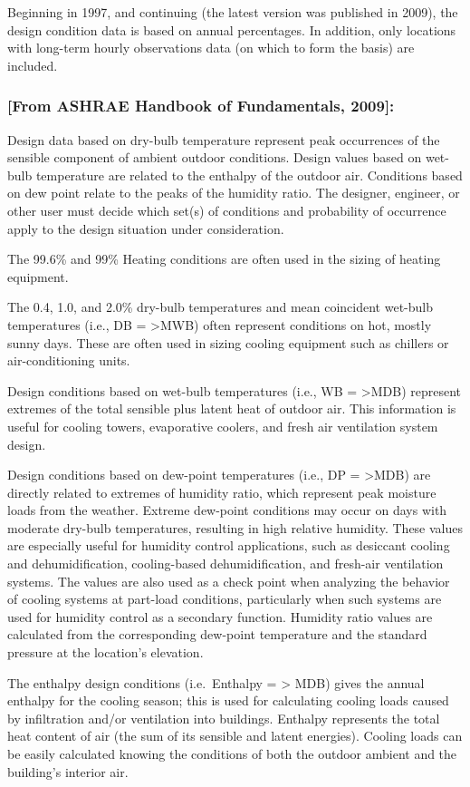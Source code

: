 Beginning in 1997, and continuing (the latest version was published in 2009), the design condition data is based on annual percentages. In addition, only locations with long-term hourly observations data (on which to form the basis) are included.

\subsubsection{{[}From ASHRAE Handbook of Fundamentals, 2009{]}:}\label{from-ashrae-handbook-of-fundamentals-2009}

Design data based on dry-bulb temperature represent peak occurrences of the sensible component of ambient outdoor conditions. Design values based on wet-bulb temperature are related to the enthalpy of the outdoor air. Conditions based on dew point relate to the peaks of the humidity ratio. The designer, engineer, or other user must decide which set(s) of conditions and probability of occurrence apply to the design situation under consideration.

The 99.6\% and 99\% Heating conditions are often used in the sizing of heating equipment.

The 0.4, 1.0, and 2.0\% dry-bulb temperatures and mean coincident wet-bulb temperatures (i.e., DB = \textgreater{}MWB) often represent conditions on hot, mostly sunny days. These are often used in sizing cooling equipment such as chillers or air-conditioning units.

Design conditions based on wet-bulb temperatures (i.e., WB = \textgreater{}MDB) represent extremes of the total sensible plus latent heat of outdoor air. This information is useful for cooling towers, evaporative coolers, and fresh air ventilation system design.

Design conditions based on dew-point temperatures (i.e., DP = \textgreater{}MDB) are directly related to extremes of humidity ratio, which represent peak moisture loads from the weather. Extreme dew-point conditions may occur on days with moderate dry-bulb temperatures, resulting in high relative humidity. These values are especially useful for humidity control applications, such as desiccant cooling and dehumidification, cooling-based dehumidification, and fresh-air ventilation systems. The values are also used as a check point when analyzing the behavior of cooling systems at part-load conditions, particularly when such systems are used for humidity control as a secondary function. Humidity ratio values are calculated from the corresponding dew-point temperature and the standard pressure at the location's elevation.

The enthalpy design conditions (i.e.~Enthalpy = \textgreater{} MDB) gives the annual enthalpy for the cooling season; this is used for calculating cooling loads caused by infiltration and/or ventilation into buildings. Enthalpy represents the total heat content of air (the sum of its sensible and latent energies). Cooling loads can be easily calculated knowing the conditions of both the outdoor ambient and the building's interior air.
